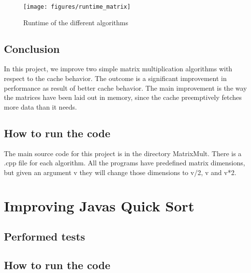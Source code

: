 \documentclass{article}
\begin{document}
\begin{figure}[H]
  \centering
  \texttt{[image: figures/runtime\_matrix]}
  \caption{Runtime of the different algorithms}
  \label{fig:runtime_matrix}
\end{figure}

\subsection{Conclusion}
In this project, we improve two simple matrix multiplication algorithms with respect to the cache behavior. The outcome is a significant improvement in performance as result of better cache behavior. The main improvement is the way the matrices have been laid out in memory, since the cache preemptively fetches more data than it needs. 

\subsection{How to run the code}
The main source code for this project is in the directory MatrixMult. There is a .cpp file for each algorithm. All the programs have predefined matrix dimensions, but given an argument v they will change those dimensions to v/2, v and v*2.

\section{Improving Javas Quick Sort}
\subsection{Performed tests}
\subsection{How to run the code}



\end{document}
